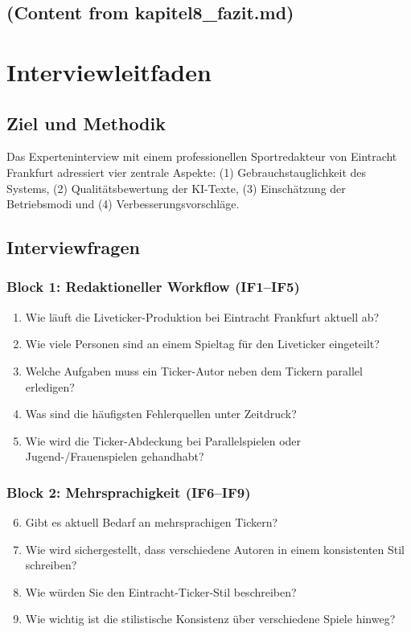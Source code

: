 \documentclass[12pt,a4paper,notitlepage,ngerman]{report}
\begin{document}
\section{(Content from kapitel8\_fazit.md)}

\appendix

\chapter{Interviewleitfaden}
\section{Ziel und Methodik}
Das Experteninterview mit einem professionellen Sportredakteur von Eintracht Frankfurt adressiert vier zentrale Aspekte: (1) Gebrauchstauglichkeit des Systems, (2) Qualitätsbewertung der KI-Texte, (3) Einschätzung der Betriebsmodi und (4) Verbesserungsvorschläge.

\section{Interviewfragen}

\subsection{Block 1: Redaktioneller Workflow (IF1--IF5)}
\begin{enumerate}
    \item Wie läuft die Liveticker-Produktion bei Eintracht Frankfurt aktuell ab?
    \item Wie viele Personen sind an einem Spieltag für den Liveticker eingeteilt?
    \item Welche Aufgaben muss ein Ticker-Autor neben dem Tickern parallel erledigen?
    \item Was sind die häufigsten Fehlerquellen unter Zeitdruck?
    \item Wie wird die Ticker-Abdeckung bei Parallelspielen oder Jugend-/Frauenspielen gehandhabt?
\end{enumerate}

\subsection{Block 2: Mehrsprachigkeit (IF6--IF9)}
\begin{enumerate}
    \setcounter{enumi}{5}
    \item Gibt es aktuell Bedarf an mehrsprachigen Tickern?
    \item Wie wird sichergestellt, dass verschiedene Autoren in einem konsistenten Stil schreiben?
    \item Wie würden Sie den Eintracht-Ticker-Stil beschreiben?
    \item Wie wichtig ist die stilistische Konsistenz über verschiedene Spiele hinweg?
\end{enumerate}
\end{document}
